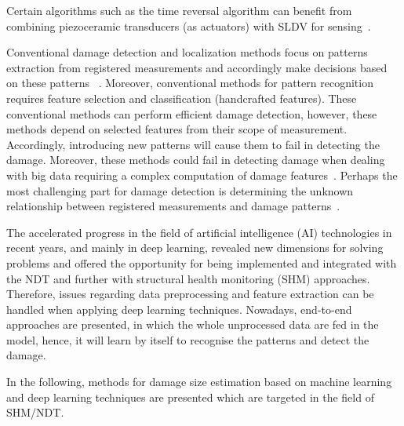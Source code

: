 \documentclass[preprint,9pt]{elsarticle}
\begin{document}
Certain algorithms such as the time reversal algorithm can benefit from combining piezoceramic transducers (as actuators) with SLDV for sensing~\cite{Girolamo2018a, Miniaci2019}.
    
Conventional damage detection and localization methods focus on patterns extraction from registered measurements and accordingly make decisions based on these patterns ~\cite{Gul2009}. 
Moreover, conventional methods for pattern recognition requires feature selection and classification (handcrafted features). 
These conventional methods can perform efficient damage detection, however, these methods depend on selected features from their scope of measurement.
Accordingly, introducing new patterns will cause them to fail in detecting the damage.
Moreover, these methods could fail in detecting damage when dealing with big data requiring a complex computation of damage features~\cite{Gulgec2019}.
Perhaps the most challenging part for damage detection is determining the unknown relationship between registered measurements and damage patterns~\cite{Gulgec2019}. 
    
The accelerated progress in the field of artificial intelligence (AI) technologies in recent years, and mainly in deep learning, revealed new dimensions for solving problems and offered the opportunity for being implemented and integrated with the NDT and further with structural health monitoring (SHM) approaches.
Therefore, issues regarding data preprocessing and feature extraction can be handled when applying deep learning techniques. 
Nowadays, end-to-end approaches are presented, in which the whole unprocessed data are fed in the model, hence, it will learn by itself to recognise the patterns and detect the damage.
    
In the following, methods for damage size estimation based on machine learning and deep learning techniques are presented which are targeted in the field of SHM/NDT.
  	
\end{document}
